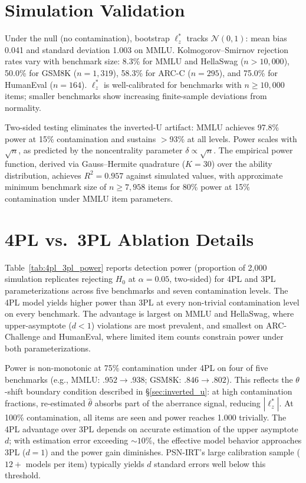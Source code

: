 \section{Simulation Validation}
\label{app:simulation}

Under the null (no contamination), bootstrap $\ell_z^*$ tracks $\mathcal{N}(0,1)$: mean bias 0.041 and standard deviation 1.003 on MMLU.
Kolmogorov--Smirnov rejection rates vary with benchmark size: 8.3\% for MMLU and HellaSwag ($n > 10{,}000$), 50.0\% for GSM8K ($n = 1{,}319$), 58.3\% for ARC-C ($n = 295$), and 75.0\% for HumanEval ($n = 164$).
$\ell_z^*$ is well-calibrated for benchmarks with $n \geq 10{,}000$ items; smaller benchmarks show increasing finite-sample deviations from normality.

Two-sided testing eliminates the inverted-U artifact: MMLU achieves 97.8\% power at 15\% contamination and sustains ${>}$93\% at all levels.
Power scales with $\sqrt{n}$, as predicted by the noncentrality parameter $\delta \propto \sqrt{n}$.
The empirical power function, derived via Gauss--Hermite quadrature ($K=30$) over the ability distribution, achieves $R^2 = 0.957$ against simulated values, with approximate minimum benchmark size of $n \geq 7{,}958$ items for 80\% power at 15\% contamination under MMLU item parameters.

\section{4PL vs.\ 3PL Ablation Details}
\label{app:4pl_ablation}

Table~\ref{tab:4pl_3pl_power} reports detection power (proportion of 2{,}000 simulation replicates rejecting $H_0$ at $\alpha{=}0.05$, two-sided) for 4PL and 3PL parameterizations across five benchmarks and seven contamination levels.
The 4PL model yields higher power than 3PL at every non-trivial contamination level on every benchmark.
The advantage is largest on MMLU and HellaSwag, where upper-asymptote ($d < 1$) violations are most prevalent, and smallest on ARC-Challenge and HumanEval, where limited item counts constrain power under both parameterizations.

Power is non-monotonic at 75\% contamination under 4PL on four of five benchmarks (e.g., MMLU: $.952 \to .938$; GSM8K: $.846 \to .802$).
This reflects the $\theta$-shift boundary condition described in \S\ref{sec:inverted_u}: at high contamination fractions, re-estimated $\hat{\theta}$ absorbs part of the aberrance signal, reducing $|\ell_z^*|$.
At 100\% contamination, all items are seen and power reaches 1.000 trivially.
The 4PL advantage over 3PL depends on accurate estimation of the upper asymptote $d$; with estimation error exceeding ${\sim}10\%$, the effective model behavior approaches 3PL ($d{=}1$) and the power gain diminishes.
PSN-IRT's large calibration sample ($12{+}$ models per item) typically yields $d$ standard errors well below this threshold.

